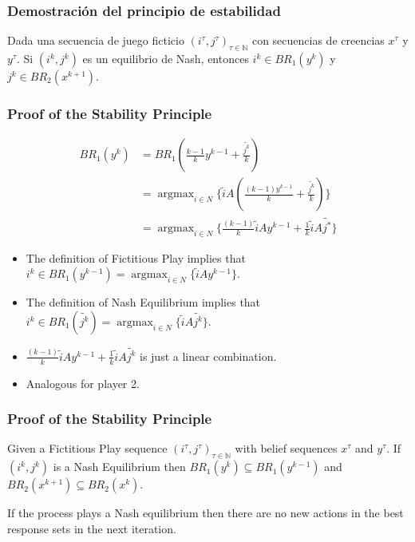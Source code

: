 \documentclass[pdf]{beamer}
\newcommand{\pstrat}{\widetilde}
\DeclareMathOperator*{\argmax}{argmax}
\begin{document}
\begin{frame}
    \frametitle{Demostración del principio de estabilidad}
    \begin{lemma}[1]
        Dada una secuencia de juego ficticio $(i^\tau, j^\tau)_{\tau \in \mathbb{N}}$ con secuencias de creencias $x^\tau$ y $y^\tau$. Si $(i^k, j^k)$ es un equilibrio de Nash, entonces $i^k \in BR_1(y^{k})$ y $j^k \in BR_2(x^{k+1})$.
    \end{lemma}
\end{frame}

\begin{frame}
    \frametitle{Proof of the Stability Principle}
    \begin{align*}
        BR_1(y^k) &= BR_1(\frac{k - 1}{k} y^{k-1} + \frac{ \pstrat{j^k}}{k}) \\
        &= \argmax_{i \in N} \{\pstrat{i} A(\frac{(k - 1)y^{k-1}}{k} + \frac{ \pstrat{j^k}}{k})\}\\
        &= \argmax_{i \in N} \{\frac{(k - 1)}{k}\pstrat{i} Ay^{k-1} + \frac{1}{k}\pstrat{i} A \pstrat{j^*}\}
    \end{align*}
    \begin{itemize}
        \item \pause The definition of Fictitious Play implies that $i^k \in BR_1(y^{k-1}) = \argmax_{i \in N}\{\pstrat{i}Ay^{k-1}\}$.
        \item \pause The definition of Nash Equilibrium implies that $i^k \in BR_1(\pstrat{j^k}) = \argmax_{i \in N}\{\pstrat{i} A \pstrat{j^k}\}$.
        \item \pause $\frac{(k - 1)}{k}\pstrat{i}Ay^{k-1} + \frac{1}{k}\pstrat{i} A \pstrat{j^k}$ is just a linear combination.
        \item \pause Analogous for player 2.
    \end{itemize}
\end{frame}

\begin{frame}
    \frametitle{Proof of the Stability Principle}
    \begin{lemma}[2]
        Given a Fictitious Play sequence $(i^\tau, j^\tau)_{\tau \in \mathbb{N}}$ with belief sequences $x^\tau$ and $y^\tau$. If $(i^k, j^k)$ is a Nash Equilibrium then $BR_1(y^{k}) \subseteq BR_1(y^{k-1})$ and $BR_2(x^{k+1}) \subseteq BR_2(x^{k})$.
    \end{lemma}
    \pause If the process plays a Nash equilibrium then there are no new actions in the best response sets in the next iteration.
\end{frame}
\end{document}

